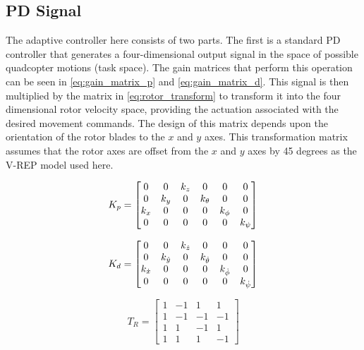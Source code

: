 \documentclass[letterpaper, 10 pt, conference]{ieeeconf}  %
\begin{document}
\subsection{PD Signal}

The adaptive controller here consists of two parts. The first is a standard PD controller that generates a four-dimensional output signal in the space of possible quadcopter motions (task space). 
The gain matrices that perform this operation can be seen in \eqref{eq:gain_matrix_p} and \eqref{eq:gain_matrix_d}. 
This signal is then multiplied by the matrix in \eqref{eq:rotor_transform} to transform it into the four dimensional rotor velocity space, providing the actuation associated with the desired movement commands.
The design of this matrix depends upon the orientation of the rotor blades to the $x$ and $y$ axes. 
This transformation matrix assumes that the rotor axes are offset from the $x$ and $y$ axes by 45 degrees as the V-REP model used here.

\begin{equation} \label{eq:gain_matrix_p}
K_{p} =
\setcounter{MaxMatrixCols}{12}
\begin{bmatrix}
0 & 0 & k_{z} & 0 & 0 & 0 \\
0 & k_{y} & 0 & k_{\theta} & 0 & 0\\
k_{x} & 0 & 0 & 0 & k_{\phi} & 0 \\
0 & 0 & 0 & 0 & 0 & k_{\psi}
\end{bmatrix}
\end{equation}

\begin{equation} \label{eq:gain_matrix_d}
K_{d} =
\setcounter{MaxMatrixCols}{12}
\begin{bmatrix}
0 & 0 & k_{\dot{z}} & 0 & 0 & 0 \\
0 & k_{\dot{y}} & 0 & k_{\dot{\theta}} & 0 & 0\\
k_{\dot{x}} & 0 & 0 & 0 & k_{\dot{\phi}} & 0 \\
0 & 0 & 0 & 0 & 0 & k_{\dot{\psi}}
\end{bmatrix}
\end{equation}

\begin{equation} \label{eq:rotor_transform}
T_{R} = 
\begin{bmatrix}
1 & -1 & 1 & 1 \\
1 & -1 & -1 & -1 \\
1 & 1 & -1 & 1 \\
1 & 1 & 1 & -1
\end{bmatrix}
\end{equation}
\end{document}
